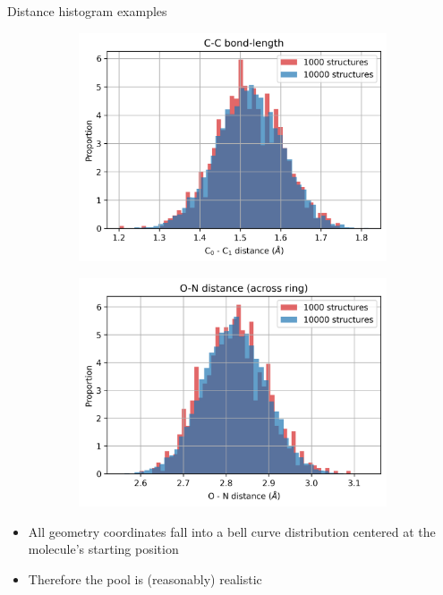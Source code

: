\documentclass{beamer}
\begin{document}
\begin{frame}{Distance histogram examples}
	\begin{figure}
		\centering
		\begin{subfigure}[b]{0.45\textwidth}
			\includegraphics[width=\textwidth]{figures/C_C_bond_length_hist.png}
		\end{subfigure}
		\begin{subfigure}[b]{0.45\textwidth}
			\includegraphics[width=\textwidth]{figures/O_N_bond_length_hist.png}
		\end{subfigure}
	\end{figure}
	\begin{itemize}
		\item All geometry coordinates fall into a bell curve distribution centered at the molecule's starting position
		\item Therefore the pool is (reasonably) realistic 
	\end{itemize}
\end{frame}
\end{document}
